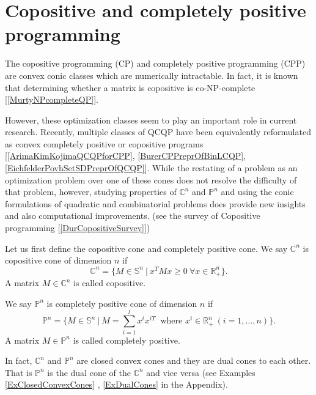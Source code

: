 \documentclass[12pt]{book}
\theoremstyle{definition}
\begin{document}
\section{Copositive and completely positive programming}


The copositive programming (CP) and completely positive programming (CPP) are convex conic classes which are %
numerically intractable. 
In fact, it is known that determining whether a matrix is copositive is co-NP-complete 	[\ref{MurtyNPcompleteQP}]. 

However, these optimization classes seem to play an important role in current research. Recently, multiple classes of QCQP have been equivalently reformulated as convex completely positive or copositive programs [\ref{ArimaKimKojimaQCQPforCPP}, \ref{BurerCPPreprOfBinLCQP}, \ref{EichfelderPovhSetSDPreprOfQCQP}]. While the restating of a problem as an optimization problem over one of these cones does not resolve
the difficulty of that problem, however, studying properties of $\mathbb{C}^n$ and $\mathbb{P}^n$ and
using the conic formulations of quadratic and combinatorial problems does
provide new insights and also computational improvements. (see the survey of Copositive programming [\ref{DurCopositiveSurvey}])


Let us first define the copositive cone and completely positive cone.
\label{defCopositiveCone} We say $\mathbb{C}^n$ is copositive cone of dimension $n$ if 
\begin{equation}
\mathbb{C}^n=\{M\in \mathbb{S}^n \ | \ x^TMx\geq 0 \ \forall x\in \mathbb{R}^n_+ \}.
\end{equation}
A matrix $M \in \mathbb{C}^n$ is called copositive.


\label{defCPPcone} We say $\mathbb{P}^n$ is completely positive cone of dimension $n$ if 
\begin{equation}
\mathbb{P}^n=\{M\in \mathbb{S}^n \ | \ M = \sum_{i = 1}^l x^{i}x^{iT} \ \mbox{ where } x^i \in \mathbb{R}^n_+ \ (i = 1,\dots ,n) \}.
\end{equation}
A matrix $M\in \mathbb{P}^n$ is called completely positive.

In fact, $\mathbb{C}^n$ and $\mathbb{P}^n$ are closed convex cones and they are dual cones to each other.
That is $\mathbb{P}^n$ is the dual cone of the $\mathbb{C}^n$ and vice versa (see Examples \ref{ExClosedConvexCones} , \ref{ExDualCones} in the Appendix).
\end{document}
